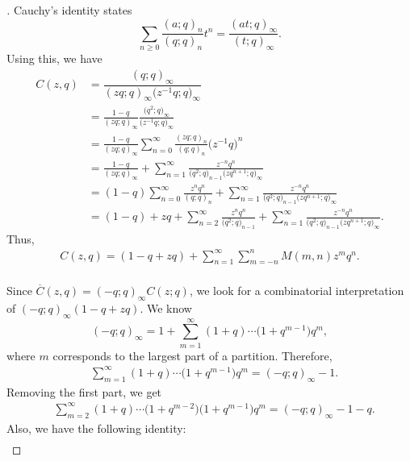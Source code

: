 \documentclass[pdftex]{sigma}
\numberwithin{equation}{section}
\newcommand\mylabel[1]{\label{#1}}
\begin{document}
\begin{proof}[\unskip\nopunct]
Cauchy's identity \cite[p.\ 17]{An98} states
\begin{equation*}%
\sum\limits_{n\geq 0}\frac{(a;q)_n}{(q;q)_{n}}t^n=\frac{(at;q)_{\infty}}{(t;q)_{\infty}}.
\end{equation*}
Using this, we have
\begin{align*}
C(z,q) &{}=\dfrac{(q;q)_{\infty}}{(zq;q)_{\infty}\bigl(z^{-1}q;q\bigr)_{\infty}}
\\
&{}=\frac{1-q}{(zq;q)_{\infty}}\frac{\bigl(q^2;q\bigr)_{\infty}}{\bigl(z^{-1}q;q\bigr)_{\infty}}
\\
&{}=\frac{1-q}{(zq;q)_{\infty}}\sum\limits_{n=0}^{\infty}\frac{(zq;q)_n}{(q;q)_n}\bigl(z^{-1}q\bigr)^n
\\
&{}=\frac{1-q}{(zq;q)_{\infty}}+\sum\limits_{n=1}^{\infty}\frac{z^{-n}q^n}{\bigl(q^2;q\bigr)_{n-1}\bigl(zq^{n+1};q\bigr)_{\infty}}
\\
&{}=(1-q)\sum\limits_{n=0}^{\infty}\frac{z^{n}q^n}{(q;q)_{n}}+\sum\limits_{n=1}^{\infty}\frac{z^{-n}q^n}{\bigl(q^2;q\bigr)_{n-1}\bigl(zq^{n+1};q\bigr)_{\infty}}
\\
&{}=(1-q)+zq+\sum\limits_{n=2}^{\infty}\frac{z^{n}q^n}{\bigl(q^2;q\bigr)_{n-1}}+\sum\limits_{n=1}^{\infty}\frac{z^{-n}q^n}{\bigl(q^2;q\bigr)_{n-1}\bigl(zq^{n+1};q\bigr)_{\infty}}.
\end{align*}
Thus,
\begin{align}
\mylabel{eq:crankexp}
C(z,q)=(1-q+zq)+\sum_{n=1}^\infty \sum_{m=-n}^n M(m,n) z^m q^n.
\end{align}
\\
Since $\overline{C}(z,q)=(-q;q)_{\infty}C(z;q)$, we look for a combinatorial interpretation of $(-q;q)_{\infty}(1-q+zq)$. We know
\begin{equation*}%
(-q;q)_{\infty}=1+\sum\limits_{m=1}^{\infty}(1+q)\cdots\bigl(1+q^{m-1}\bigr)q^m,
\end{equation*}
where $m$ corresponds to the largest part of a partition. Therefore,
\begin{align}
\mylabel{eq:distexp}
&\sum\limits_{m=1}^{\infty}(1+q)\cdots\bigl(1+q^{m-1}\bigr)q^m=(-q;q)_{\infty}-1.
\end{align}
Removing the first part, we get
\begin{align}
\mylabel{eq:RFP1}
&\sum\limits_{m=2}^{\infty}(1+q)\cdots\bigl(1+q^{m-2}\bigr)\bigl(1+q^{m-1}\bigr)q^m=(-q;q)_{\infty}-1-q.
\end{align}
Also, we have the following identity:
\begin{align}

\end{align}
\end{proof}
\end{document}
